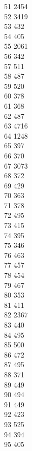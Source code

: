 { 51	2454 \\
 52	3419 \\
 53	432 \\
 54	405 \\
 55	2061 \\
 56	342 \\
 57	511 \\
 58	487 \\
 59	520 \\
 60	378 \\
 61	368 \\
 62	487 \\
 63	4716 \\
 64	1248 \\
 65	397 \\
 66	370 \\
 67	3073 \\
 68	372 \\
 69	429 \\
 70	363 \\
 71	378 \\
 72	495 \\
 73	415 \\
 74	395 \\
 75	346 \\
 76	463 \\
 77	457 \\
 78	454 \\
 79	467 \\
 80	353 \\
 81	411 \\
 82	2367 \\
 83	440 \\
 84	495 \\
 85	500 \\
 86	472 \\
 87	495 \\
 88	371 \\
 89	449 \\
 90	494 \\
 91	449 \\
 92	423 \\
 93	525 \\
 94	394 \\
 95	405 \\
}
